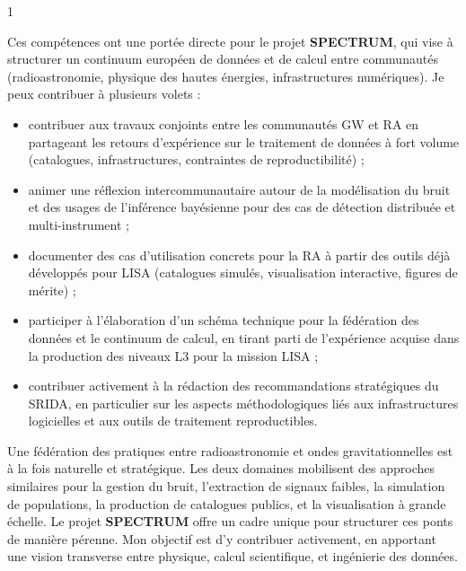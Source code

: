 \documentclass[10pt,a4paper]{../_shared/altacv}
\begin{document}
\begin{paracol}{1}
{Ces compétences ont une portée directe pour le projet \textbf{SPECTRUM}, qui vise à structurer un continuum européen de données et de calcul entre communautés (radioastronomie, physique des hautes énergies, infrastructures numériques). Je peux contribuer à plusieurs volets :
\begin{itemize}
  \item contribuer aux travaux conjoints entre les communautés GW et RA en partageant les retours d'expérience sur le traitement de données à fort volume (catalogues, infrastructures, contraintes de reproductibilité) ;
  \item animer une réflexion intercommunautaire autour de la modélisation du bruit et des usages de l'inférence bayésienne pour des cas de détection distribuée et multi-instrument ;
  \item documenter des cas d'utilisation concrets pour la RA à partir des outils déjà développés pour LISA (catalogues simulés, visualisation interactive, figures de mérite) ;
  \item participer à l'élaboration d'un schéma technique pour la fédération des données et le continuum de calcul, en tirant parti de l'expérience acquise dans la production des niveaux L3 pour la mission LISA ;
  \item contribuer activement à la rédaction des recommandations stratégiques du SRIDA, en particulier sur les aspects méthodologiques liés aux infrastructures logicielles et aux outils de traitement reproductibles.
\end{itemize}


Une fédération des pratiques entre radioastronomie et ondes gravitationnelles est à la fois naturelle et stratégique. Les deux domaines mobilisent des approches similaires pour la gestion du bruit, l'extraction de signaux faibles, la simulation de populations, la production de catalogues publics, et la visualisation à grande échelle. Le projet \textbf{SPECTRUM} offre un cadre unique pour structurer ces ponts de manière pérenne. Mon objectif est d'y contribuer activement, en apportant une vision transverse entre physique, calcul scientifique, et ingénierie des données.


}


\end{paracol}
\end{document}
